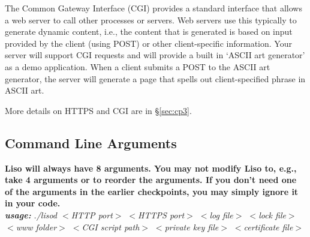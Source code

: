  The Common Gateway Interface (CGI) provides a standard interface that allows a web server to call other processes or servers.  Web servers use this typically to generate dynamic content, i.e., the content that is generated is based on input provided by the client (using POST) or other client-specific information. 
Your server will support CGI requests and will provide a built in `ASCII art generator' as a demo application.
When a client submits a POST to the ASCII art generator, the server will generate a page that spells out client-specified phrase in ASCII art.

\vspace{5pt}

\noindent More details on HTTPS and CGI are in \S\ref{sec:cp3}.
\subsection{Command Line Arguments}
\noindent\textbf{Liso will always have 8 arguments. You may not modify Liso to, e.g., take 4 arguments or to reorder the arguments. If you don't need one of the arguments in the earlier checkpoints, you may simply ignore it in your code.}\\

\textbf{\emph{usage:}} \emph{./lisod $<$HTTP port$>$ $<$HTTPS port$>$
                             $<$log file$>$ $<$lock file$>$ $<$www folder$>$
                             $<$CGI script path$>$ $<$private key file$>$ $<$certificate file$>$}

